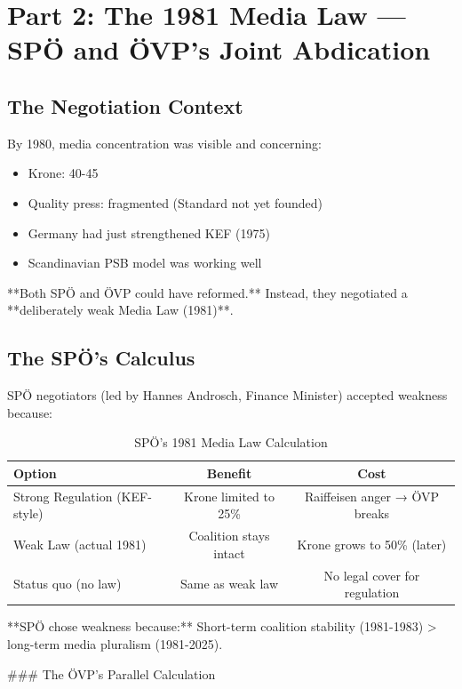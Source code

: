 \section*{Part 2: The 1981 Media Law --- SPÖ and ÖVP's Joint Abdication}

\subsection*{The Negotiation Context}

By 1980, media concentration was visible and concerning:
\begin{itemize}
\item Krone: 40-45%
\item Quality press: fragmented (Standard not yet founded)
\item Germany had just strengthened KEF (1975)
\item Scandinavian PSB model was working well
\end{itemize}

**Both SPÖ and ÖVP could have reformed.** Instead, they negotiated a **deliberately weak Media Law (1981)**.

\subsection*{The SPÖ's Calculus}

SPÖ negotiators (led by Hannes Androsch, Finance Minister) accepted weakness because:

\begin{table}[h]
\centering
\caption{SPÖ's 1981 Media Law Calculation}
\label{tab:bh-spoe-1981-calc}
\begin{tabular}{|l|c|c|}
\hline
\textbf{Option} & \textbf{Benefit} & \textbf{Cost} \\
\hline
Strong Regulation (KEF-style) & Krone limited to 25\% & Raiffeisen anger → ÖVP breaks \\
\hline
Weak Law (actual 1981) & Coalition stays intact & Krone grows to 50\% (later) \\
\hline
Status quo (no law) & Same as weak law & No legal cover for regulation \\
\hline
\end{tabular}
\end{table}

**SPÖ chose weakness because:** Short-term coalition stability (1981-1983) > long-term media pluralism (1981-2025).

### The ÖVP's Parallel Calculation

